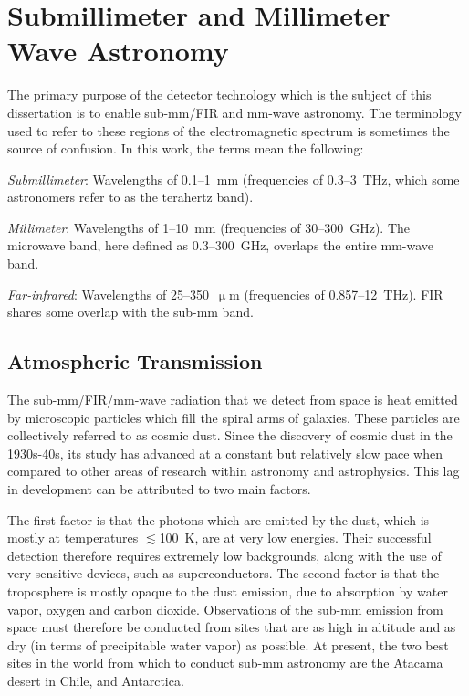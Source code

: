\section{Submillimeter and Millimeter Wave Astronomy}\label{submillimeter}

The primary purpose of the detector technology which is the subject of this dissertation is to enable sub-mm/FIR and mm-wave astronomy. The terminology used to refer to these regions of the electromagnetic spectrum is sometimes the source of confusion. In this work, the terms mean the following:

\vspace{5mm}

\textit{Submillimeter}: Wavelengths of 0.1--1~mm (frequencies of 0.3--3~THz, which some astronomers refer to as the terahertz band).

\textit{Millimeter}: Wavelengths of 1--10~mm (frequencies of 30--300~GHz). The microwave band, here defined as 0.3--300~GHz, overlaps the entire mm-wave band.

\textit{Far-infrared}: Wavelengths of 25--350~$\upmu$m (frequencies of 0.857--12~THz). FIR shares some overlap with the sub-mm band.

\subsection{Atmospheric Transmission}

The sub-mm/FIR/mm-wave radiation that we detect from space is heat emitted by microscopic particles which fill the spiral arms of galaxies. These particles are collectively referred to as cosmic dust. Since the discovery of cosmic dust in the 1930s-40s, its study has advanced at a constant but relatively slow pace when compared to other areas of research within astronomy and astrophysics. This lag in development can be attributed to two main factors.

The first factor is that the photons which are emitted by the dust, which is mostly at temperatures $\lesssim$100~K, are at very low energies. Their successful detection therefore requires extremely low backgrounds, along with the use of very sensitive devices, such as superconductors. The second factor is that the troposphere is mostly opaque to the dust emission, due to absorption by water vapor, oxygen and carbon dioxide. Observations of the sub-mm emission from space must therefore be conducted from sites that are as high in altitude and as dry (in terms of precipitable water vapor) as possible. At present, the two best sites in the world from which to conduct sub-mm astronomy are the Atacama desert in Chile, and Antarctica.

